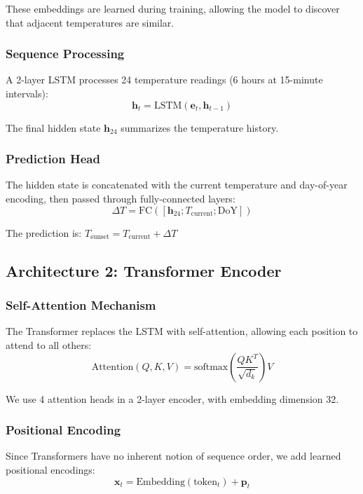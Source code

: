\documentclass[11pt,letterpaper]{article}
\begin{document}
These embeddings are learned during training, allowing the model to discover that adjacent temperatures are similar.

\subsubsection{Sequence Processing}
A 2-layer LSTM processes 24 temperature readings (6 hours at 15-minute intervals):
\begin{equation}
    \mathbf{h}_t = \text{LSTM}(\mathbf{e}_t, \mathbf{h}_{t-1})
\end{equation}

The final hidden state $\mathbf{h}_{24}$ summarizes the temperature history.

\subsubsection{Prediction Head}
The hidden state is concatenated with the current temperature and day-of-year encoding, then passed through fully-connected layers:
\begin{equation}
    \Delta T = \text{FC}([\mathbf{h}_{24}; T_\text{current}; \text{DoY}])
\end{equation}

The prediction is: $\hat{T}_\text{sunset} = T_\text{current} + \Delta T$

\subsection{Architecture 2: Transformer Encoder}

\subsubsection{Self-Attention Mechanism}
The Transformer replaces the LSTM with self-attention, allowing each position to attend to all others:
\begin{equation}
    \text{Attention}(Q, K, V) = \text{softmax}\left(\frac{QK^T}{\sqrt{d_k}}\right)V
\end{equation}

We use 4 attention heads in a 2-layer encoder, with embedding dimension 32.

\subsubsection{Positional Encoding}
Since Transformers have no inherent notion of sequence order, we add learned positional encodings:
\begin{equation}
    \mathbf{x}_t = \text{Embedding}(\text{token}_t) + \mathbf{p}_t
\end{equation}
\end{document}
